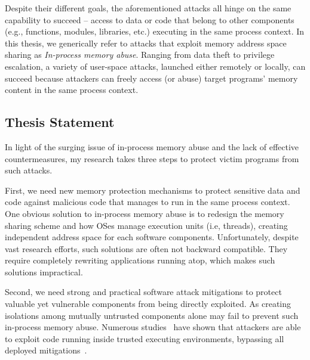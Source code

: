 Despite their different goals, the aforementioned attacks all hinge on the same capability to succeed -- access to data or code that belong to other components (e.g., functions, modules, libraries, etc.) executing in the same process context.
 In this thesis, we generically refer to attacks that exploit memory address space sharing as \emph{In-process memory abuse}. Ranging from data theft to privilege escalation, a variety of user-space attacks, launched either remotely or locally, can succeed because attackers can freely access (or abuse) target programs' memory content in the same process context.

\subsection{Thesis Statement}

In light of the surging issue of in-process memory abuse and the lack of effective countermeasures, my research takes three steps to protect victim programs from such attacks.

First, we need new memory protection mechanisms to protect sensitive data and code against malicious code that manages to run in the same process context. One obvious solution to in-process memory abuse is to redesign the memory sharing scheme and how OSes manage execution units (i.e, threads), creating independent address space for each software components. Unfortunately, despite vast research efforts, such solutions are often not backward compatible. They require completely rewriting applications running atop, which makes such solutions impractical.

Second, we need strong and practical software attack mitigations to protect valuable yet vulnerable components from being directly exploited. As creating isolations among mutually untrusted components alone may fail to prevent such in-process memory abuse. Numerous studies~\cite{boomerang,tsgx} have shown that attackers are able to exploit code running inside trusted executing environments, bypassing all deployed mitigations~\cite{controljujutsu,jitrop,rop}. 

